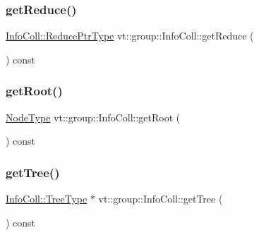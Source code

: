\mbox{\label{structvt_1_1group_1_1_info_coll_a297cafe0cae350b83a677db585865e62}} 
\subsubsection{\texorpdfstring{get\+Reduce()}{getReduce()}}
{\footnotesize\ttfamily \hyperlink{structvt_1_1group_1_1_info_coll_a1b9fe0214f622ed9e8987531f44ef1fa}{Info\+Coll\+::\+Reduce\+Ptr\+Type} vt\+::group\+::\+Info\+Coll\+::get\+Reduce (\begin{DoxyParamCaption}{ }\end{DoxyParamCaption}) const}

\mbox{\label{structvt_1_1group_1_1_info_coll_a5724786f46add3ccf7ca081774609f0c}} 
\subsubsection{\texorpdfstring{get\+Root()}{getRoot()}}
{\footnotesize\ttfamily \hyperlink{namespacevt_a866da9d0efc19c0a1ce79e9e492f47e2}{Node\+Type} vt\+::group\+::\+Info\+Coll\+::get\+Root (\begin{DoxyParamCaption}{ }\end{DoxyParamCaption}) const}

\mbox{\label{structvt_1_1group_1_1_info_coll_a2e7551dd6e85e5f3a6a7907b70f040c4}} 
\subsubsection{\texorpdfstring{get\+Tree()}{getTree()}}
{\footnotesize\ttfamily \hyperlink{structvt_1_1group_1_1_info_base_a96e01b6097ed7b2bc299027d0a7a1b1e}{Info\+Coll\+::\+Tree\+Type} $\ast$ vt\+::group\+::\+Info\+Coll\+::get\+Tree (\begin{DoxyParamCaption}{ }\end{DoxyParamCaption}) const}

